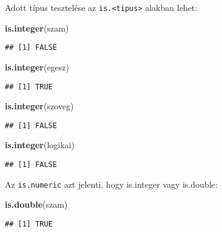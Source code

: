 \documentclass[]{book}
\newenvironment{Shaded}{\begin{snugshade}}{\end{snugshade}}
\newcommand{\KeywordTok}[1]{\textcolor[rgb]{0.13,0.29,0.53}{\textbf{#1}}}
\newcommand{\NormalTok}[1]{#1}
\begin{document}
Adott típus tesztelése az \texttt{is.\textless{}tipus\textgreater{}}
alakban lehet:

\begin{Shaded}
\begin{Highlighting}[]
\KeywordTok{is.integer}\NormalTok{(szam)}
\end{Highlighting}
\end{Shaded}

\begin{verbatim}
## [1] FALSE
\end{verbatim}

\begin{Shaded}
\begin{Highlighting}[]
\KeywordTok{is.integer}\NormalTok{(egesz)}
\end{Highlighting}
\end{Shaded}

\begin{verbatim}
## [1] TRUE
\end{verbatim}

\begin{Shaded}
\begin{Highlighting}[]
\KeywordTok{is.integer}\NormalTok{(szoveg)}
\end{Highlighting}
\end{Shaded}

\begin{verbatim}
## [1] FALSE
\end{verbatim}

\begin{Shaded}
\begin{Highlighting}[]
\KeywordTok{is.integer}\NormalTok{(logikai)}
\end{Highlighting}
\end{Shaded}

\begin{verbatim}
## [1] FALSE
\end{verbatim}

Az \texttt{is.numeric} azt jelenti, hogy is.integer vagy is.double:

\begin{Shaded}
\begin{Highlighting}[]
\KeywordTok{is.double}\NormalTok{(szam)}
\end{Highlighting}
\end{Shaded}

\begin{verbatim}
## [1] TRUE
\end{verbatim}
\end{document}

